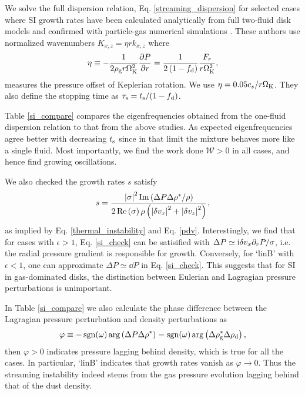We solve the full dispersion relation, Eq. \ref{streaming_dispersion} for selected cases where SI  
growth rates have been 
calculated analytically from full two-fluid disk models and confirmed
with particle-gas numerical simulations 
\citep[namely][]{youdin07b,bai10b}. These authors use normalized
wavenumbers $K_{x,z} = \eta r k_{x,z}$ where
\begin{align} 
  \eta \equiv -\frac{1}{2\rho_\mathrm{g} r\Omega_{\rm K}^2}\frac{\partial P}{\partial r} = 
  \frac{1}{2\left(1-f_\mathrm{d}\right)}\frac{F_r}{r\Omega_{\rm K}^2}, 
\end{align} 
measures the pressure offset of Keplerian rotation. We use
$\eta=0.05c_s/r\Omega_{\rm K}$. They also define the stopping time as
$\tau_\mathrm{s}=t_\mathrm{s}/(1-f_\mathrm{d})$.  

Table \ref{si_compare} compares the eigenfrequencies obtained from the
one-fluid dispersion relation to that from the above studies. As  
expected eigenfrequencies agree better with decreasing $t_\mathrm{s}$ since
in that limit the mixture behaves more like a single fluid. Most 
importantly, we find the work done $\mathcal{W}>0$ in all cases, and
hence find growing oscillations. 


We also checked the growth rates $s$ satisfy 
\begin{align} 
  s = \frac{\left|\sigma\right|^2\operatorname{Im}\left(\Delta P
    \Delta\rho^*/\rho\right)}{2\operatorname{Re}\left(\sigma\right)\rho\left(\left|\delta
  v_x\right|^2+\left|\delta
  v_z\right|^2\right)}, \label{si_check}
\end{align}
as implied by Eq. \ref{thermal_instability} and
Eq. \ref{pdv}. %
Interestingly, we find that for cases with
$\epsilon>1$, Eq. \ref{si_check} can be satisified with $\Delta
P\simeq \mathrm{i}\delta v_x \partial_rP/\sigma$, i.e. the radial pressure gradient
is responsible for growth. Conversely, for `linB' with $\epsilon
< 1$, one can approximate $\Delta P \simeq \dd P$ in Eq. \ref{si_check}. This
suggests that for SI in gas-dominated disks, the distinction between
Eulerian and Lagragian pressure perturbations is unimportant. 

In Table \ref{si_compare} we also calculate the phase difference
between the Lagragian pressure perturbation and density perturbations
as    
\begin{align*} 
\varphi \equiv -\operatorname{sgn}(\omega)\arg\left(\Delta P\Delta\rho^*\right)
        = \operatorname{sgn}(\omega)\arg\left(\Delta\rho_\mathrm{g}^*\Delta\rho_\mathrm{d}\right),\notag
\end{align*}
then $\varphi > 0 $ indicates pressure lagging behind density, which
is true for all the cases. In particular, `linB' indicates that growth
rates vanish as $\varphi \to 0$.  
Thus the streaming instability indeed stems  
from the gas pressure evolution lagging behind that of the dust 
density. 

